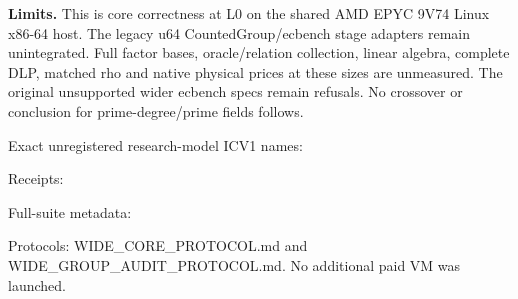 \documentclass[10pt]{article}
\begin{document}
\textbf{Limits.} This is core correctness at L0 on the shared AMD EPYC
9V74 Linux x86-64 host. The legacy u64 CountedGroup/ecbench stage adapters
remain unintegrated. Full factor bases, oracle/relation collection, linear
algebra, complete DLP, matched rho and native physical prices at these sizes
are unmeasured. The original unsupported wider ecbench specs remain refusals.
No crossover or conclusion for prime-degree/prime fields follows.

\begin{flushleft}\footnotesize
Exact unregistered research-model ICV1 names:\par
{}\par
{}\par
{}\par
Receipts: \par
Full-suite metadata: \par
Protocols: WIDE_CORE_PROTOCOL.md and WIDE_GROUP_AUDIT_PROTOCOL.md.
No additional paid VM was launched.
\end{flushleft}
\end{document}
